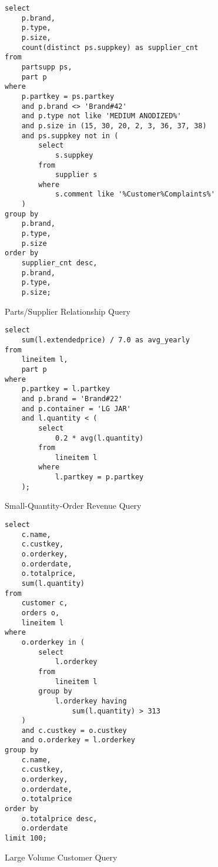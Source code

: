 \begin{listing}[!ht]
\begin{verbatim}
select
    p.brand,
    p.type,
    p.size,
    count(distinct ps.suppkey) as supplier_cnt
from
    partsupp ps,
    part p
where
    p.partkey = ps.partkey
    and p.brand <> 'Brand#42'
    and p.type not like 'MEDIUM ANODIZED%'
    and p.size in (15, 30, 20, 2, 3, 36, 37, 38)
    and ps.suppkey not in (
        select
            s.suppkey
        from
            supplier s
        where
            s.comment like '%Customer%Complaints%'
    )
group by
    p.brand,
    p.type,
    p.size
order by
    supplier_cnt desc,
    p.brand,
    p.type,
    p.size;
\end{verbatim}
\caption{Parts/Supplier Relationship Query}
\end{listing}

\begin{listing}[!ht]
\begin{verbatim}
select
    sum(l.extendedprice) / 7.0 as avg_yearly
from
    lineitem l,
    part p
where
    p.partkey = l.partkey
    and p.brand = 'Brand#22'
    and p.container = 'LG JAR'
    and l.quantity < (
        select
            0.2 * avg(l.quantity)
        from
            lineitem l
        where
            l.partkey = p.partkey
    );
\end{verbatim}
\caption{Small-Quantity-Order Revenue Query}
\end{listing}

\begin{listing}[!ht]
\begin{verbatim}
select
    c.name,
    c.custkey,
    o.orderkey,
    o.orderdate,
    o.totalprice,
    sum(l.quantity)
from
    customer c,
    orders o,
    lineitem l
where
    o.orderkey in (
        select
            l.orderkey
        from
            lineitem l
        group by
            l.orderkey having
                sum(l.quantity) > 313
    )
    and c.custkey = o.custkey
    and o.orderkey = l.orderkey
group by
    c.name,
    c.custkey,
    o.orderkey,
    o.orderdate,
    o.totalprice
order by
    o.totalprice desc,
    o.orderdate
limit 100;
\end{verbatim}
\caption{Large Volume Customer Query}
\end{listing}

